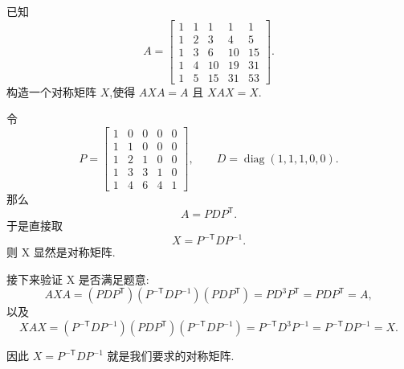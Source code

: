 \begin{problem}
已知
\[
    A=
    \begin{bmatrix}
        1 & 1 & 1 & 1 & 1\\
        1 & 2 & 3 & 4 & 5\\
        1 & 3 & 6 & 10 & 15\\
        1 & 4 & 10 & 19 & 31\\
        1 & 5 & 15 & 31 & 53
    \end{bmatrix}.
\]
构造一个对称矩阵 $X$,使得 $AXA=A$ 且 $XAX=X$.
\begin{solution}
    令
    \[
        P=
        \begin{bmatrix}
            1 & 0 & 0 & 0 & 0\\
            1 & 1 & 0 & 0 & 0\\
            1 & 2 & 1 & 0 & 0\\
            1 & 3 & 3 & 1 & 0\\
            1 & 4 & 6 & 4 & 1
        \end{bmatrix},
        \qquad
        D=\operatorname{diag}(1,1,1,0,0).
    \]
    那么
    \[
        A=PDP^{\mathsf T}.
    \]
    于是直接取
    \[
        X=P^{-\mathsf T}DP^{-1}.
    \]
    则 X 显然是对称矩阵.

    接下来验证 X 是否满足题意:
    \[
        AXA
        =\left(PDP^{\mathsf T}\right)\left(P^{-\mathsf T}DP^{-1}\right)\left(PDP^{\mathsf T}\right)
        =PD^3P^{\mathsf T}
        =PDP^{\mathsf T}
        =A,
    \]
    以及
    \[
        XAX
        =\left(P^{-\mathsf T}DP^{-1}\right)\left(PDP^{\mathsf T}\right)\left(P^{-\mathsf T}DP^{-1}\right)
        =P^{-\mathsf T}D^3P^{-1}
        =P^{-\mathsf T}DP^{-1}
        =X.
    \]

    因此 $X=P^{-\mathsf T}DP^{-1}$ 就是我们要求的对称矩阵.


\end{solution}
\end{problem}
